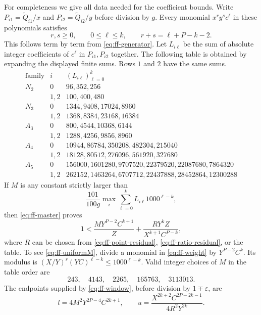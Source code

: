 \documentclass[12pt]{article}
\numberwithin{equation}{section}
\begin{document}
For completeness we give all data needed for the coefficient bounds.
Write $P_{i1}=\widetilde Q_{i1}/x$ and $P_{i2}=\widetilde Q_{i2}/y$ before division by $g$.
Every monomial $x^r y^s c^\ell$ in these polynomials satisfies
\begin{equation}\label{eq:ff-weight}
 r,s\ge0,\qquad 0\le\ell\le k,\qquad r+s=\ell+P-k-2.
\end{equation}
This follows term by term from \eqref{eq:ff-generator}.
Let $L_{i\ell}$ be the sum of absolute integer coefficients of
$c^\ell$ in $P_{i1},P_{i2}$ together. The following table is obtained
by expanding the displayed finite sums. Rows $1$ and $2$ have the same sums.
\[
\begin{array}{c|c|l}
 \text{family}&i&(L_{i\ell})_{\ell=0}^k\\ \hline
N_2&0&96,352,256\\
 &1,2&100,400,480\\
N_3&0&1344,9408,17024,8960\\
 &1,2&1368,8384,23168,16384\\
A_3&0&800,4544,10368,6144\\
 &1,2&1288,4256,9856,8960\\
A_4&0&10944,86784,350208,482304,215040\\
 &1,2&18128,80512,276096,561920,327680\\
A_5&0&156000,1601280,9707520,22379520,22087680,7864320\\
 &1,2&262152,1463264,6707712,22437888,28452864,12300288
\end{array}
\]
If $M$ is any constant strictly larger than
\begin{equation}\label{eq:ff-uniformM}
 \frac{101}{100g}\max_i\sum_{\ell=0}^k
                       L_{i\ell}1000^{\ell-k},
\end{equation}
then \eqref{eq:ff-master} proves
\begin{equation*}
 1<\frac{M Y^{P-2}C^{k+1}}Z
       +\frac{R Y^kZ}{X^{k+1}C^{P-k}},
\end{equation*}
where $R$ can be chosen from \eqref{eq:ff-point-residual},
\eqref{eq:ff-ratio-residual}, or the table.
To see \eqref{eq:ff-uniformM}, divide a monomial in
\eqref{eq:ff-weight} by $Y^{P-2}C^k$. Its modulus is
$(X/Y)^r(YC)^{\ell-k}\le1000^{\ell-k}$.
Valid integer choices of $M$ in the table order are
\[
 243,\quad4143,\quad2265,\quad165763,\quad3113013.
\]
The endpoints supplied by
\eqref{eq:ff-window}, before division by $1\mp\varepsilon$, are
\begin{equation*}
 l=4M^2Y^{2P-4}C^{2k+1},\qquad
 u=\frac{X^{2k+2}C^{2P-2k-1}}{4R^2Y^{2k}}.
\end{equation*}
\end{document}
